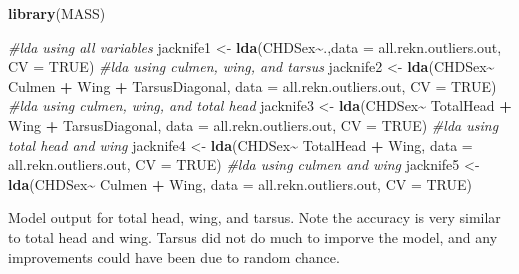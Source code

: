 \documentclass[
]{article}
\newenvironment{Shaded}{\begin{snugshade}}{\end{snugshade}}
\newcommand{\CommentTok}[1]{\textcolor[rgb]{0.56,0.35,0.01}{\textit{#1}}}
\newcommand{\DataTypeTok}[1]{\textcolor[rgb]{0.13,0.29,0.53}{#1}}
\newcommand{\KeywordTok}[1]{\textcolor[rgb]{0.13,0.29,0.53}{\textbf{#1}}}
\newcommand{\NormalTok}[1]{#1}
\newcommand{\OperatorTok}[1]{\textcolor[rgb]{0.81,0.36,0.00}{\textbf{#1}}}
\newcommand{\OtherTok}[1]{\textcolor[rgb]{0.56,0.35,0.01}{#1}}
\newcommand{\StringTok}[1]{\textcolor[rgb]{0.31,0.60,0.02}{#1}}
\begin{document}
\begin{Shaded}
\begin{Highlighting}[]
\KeywordTok{library}\NormalTok{(MASS)}

\CommentTok{\#lda using all variables}
\NormalTok{jacknife1 \textless{}{-}}\StringTok{ }\KeywordTok{lda}\NormalTok{(CHDSex}\OperatorTok{\textasciitilde{}}\NormalTok{.,}\DataTypeTok{data =}\NormalTok{ all.rekn.outliers.out, }\DataTypeTok{CV =} \OtherTok{TRUE}\NormalTok{)}
\CommentTok{\#lda using culmen, wing, and tarsus}
\NormalTok{jacknife2 \textless{}{-}}\StringTok{ }\KeywordTok{lda}\NormalTok{(CHDSex}\OperatorTok{\textasciitilde{}}\StringTok{ }\NormalTok{Culmen }\OperatorTok{+}\StringTok{ }\NormalTok{Wing }\OperatorTok{+}\StringTok{ }\NormalTok{TarsusDiagonal, }\DataTypeTok{data =}\NormalTok{ all.rekn.outliers.out, }\DataTypeTok{CV =} \OtherTok{TRUE}\NormalTok{)}
\CommentTok{\#lda using culmen, wing, and total head}
\NormalTok{jacknife3 \textless{}{-}}\StringTok{ }\KeywordTok{lda}\NormalTok{(CHDSex}\OperatorTok{\textasciitilde{}}\StringTok{ }\NormalTok{TotalHead }\OperatorTok{+}\StringTok{ }\NormalTok{Wing }\OperatorTok{+}\StringTok{ }\NormalTok{TarsusDiagonal, }\DataTypeTok{data =}\NormalTok{ all.rekn.outliers.out, }\DataTypeTok{CV =} \OtherTok{TRUE}\NormalTok{)}
\CommentTok{\#lda using total head and wing}
\NormalTok{jacknife4 \textless{}{-}}\StringTok{ }\KeywordTok{lda}\NormalTok{(CHDSex}\OperatorTok{\textasciitilde{}}\StringTok{ }\NormalTok{TotalHead }\OperatorTok{+}\StringTok{ }\NormalTok{Wing, }\DataTypeTok{data =}\NormalTok{ all.rekn.outliers.out, }\DataTypeTok{CV =} \OtherTok{TRUE}\NormalTok{)}
\CommentTok{\#lda using culmen and wing}
\NormalTok{jacknife5 \textless{}{-}}\StringTok{ }\KeywordTok{lda}\NormalTok{(CHDSex}\OperatorTok{\textasciitilde{}}\StringTok{ }\NormalTok{Culmen }\OperatorTok{+}\StringTok{ }\NormalTok{Wing, }\DataTypeTok{data =}\NormalTok{ all.rekn.outliers.out, }\DataTypeTok{CV =} \OtherTok{TRUE}\NormalTok{)}
\end{Highlighting}
\end{Shaded}

Model output for total head, wing, and tarsus. Note the accuracy is very
similar to total head and wing. Tarsus did not do much to imporve the
model, and any improvements could have been due to random chance.
\end{document}
